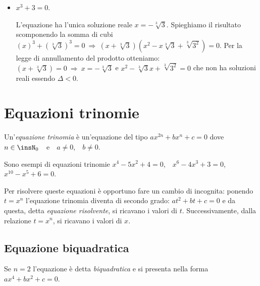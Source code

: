 \begin{exrig}
\begin{esempio}
\begin{itemize}
\item $x^3+3=0$.

L'equazione ha l'unica soluzione reale $x=-\sqrt[3]3$. Spieghiamo il risultato scomponendo la somma di cubi $\left(x\right)^3+\left(\sqrt[3]3\right)^3=0 \:\Rightarrow\: \left(x+\sqrt[3]3\right) \left(x^2-x\sqrt[3]3+\sqrt[3]{3^2}\right)=0$. Per la legge di annullamento del prodotto otteniamo: $\left(x+\sqrt[3]3\right)=0 \:\Rightarrow\: x=-\sqrt[3] 3$ e $x^2-\sqrt[3]3 x+\sqrt[3]{3^2}=0$ che non ha soluzioni reali essendo $\Delta <0$.
\end{itemize}
 \end{esempio}
\end{exrig}

\ovalbox{\risolvii \ref{ese:5.12}, \ref{ese:5.13}, \ref{ese:5.14}, \ref{ese:5.15}, \ref{ese:5.16}, \ref{ese:5.17}}

\section{Equazioni trinomie}

\begin{definizione}
Un'\emph{equazione trinomia} è un'equazione del tipo $ax^{2n}+bx^n+c=0$ dove $n \in \insN_0$~~e~~$a\neq 0$,~~$b\neq 0$.
\end{definizione}

Sono esempi di equazioni trinomie $x^4-5x^2+4=0$,\ \  $x^6-4x^3+3=0$,\ \ $x^{10}-x^5+6=0$.

Per risolvere queste equazioni è opportuno fare un cambio di incognita: ponendo $t=x^n$ l'equazione trinomia diventa di secondo grado: $at^2+bt+c=0$ e da questa, detta \emph{equazione risolvente}, si ricavano i valori di $t$. Successivamente, dalla relazione $t=x^n$, si ricavano i valori di $x$.

\subsection{Equazione biquadratica}

Se $n=2$ l'equazione è detta \emph{biquadratica} e si presenta nella forma~~$ax^4+bx^2+c=0$.

